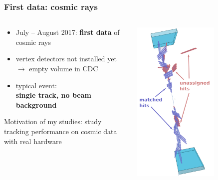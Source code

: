 \documentclass[18pt, aspectratio=169]{beamer}
\newcommand{\kitemph}[1]{\textcolor{kit-green100}{\bf{#1}}}
\begin{document}
\begin{frame}
  \frametitle{First data: cosmic rays}
  \begin{columns}
    \begin{column}{0.6\textwidth}
      \begin{itemize}
      \item July -- August 2017: \kitemph{first data} of cosmic rays
      \item vertex detectors not installed yet\\
        $\rightarrow$ empty volume in CDC
      \item typical event:\\\kitemph{single track, no beam background}
      \end{itemize}
      \begin{block}{Motivation of my studies:}
        study tracking performance on cosmic data with real hardware
      \end{block}
    \end{column}
    \begin{column}{0.4\textwidth}
      \centering
      \includegraphics[width=0.65\textwidth]{figures/b2display_screenshots/gcr_mc_2017-08_run3940_evt2754_twotrackevent_3d_annotated.png}
    \end{column}
  \end{columns}


\end{frame}
\end{document}
